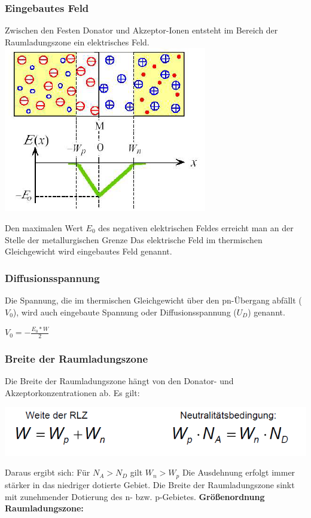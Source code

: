 	\subsubsection{Eingebautes Feld}
	
		\begin{center}
			Zwischen den Festen Donator und Akzeptor-Ionen entsteht im Bereich der Raumladungszone ein elektrisches Feld.
			\includegraphics[width=0.4\linewidth]{Kapitel/Kap08/eingebautesFeld.png}
		\end{center}
		Den maximalen Wert $E_0$ des negativen elektrischen Feldes erreicht man an der Stelle der metallurgischen Grenze
		\newline
		Das elektrische Feld im thermischen Gleichgewicht wird eingebautes Feld genannt.
		
	\subsubsection{Diffusionsspannung}
		Die Spannung, die im thermischen Gleichgewicht über den pn-Übergang abfällt ($V_0$), wird auch 		eingebaute Spannung oder Diffusionsspannung ($U_D$) genannt.
		
		$V_0 = - \frac{E_0*W}{2}$
		
	\subsubsection{Breite der Raumladungszone}
		Die Breite der Raumladungszone hängt von den Donator- und Akzeptorkonzentrationen ab. Es gilt:			
		\begin{center}
			\includegraphics[width=0.5\linewidth]{Kapitel/Kap08/breiteRaumladungszoneNeutralisaetsbedingung.png}	
		\end{center}
	
		Daraus ergibt sich:	Für $N_A > N_D$ gilt $W_n > W_p$
		\newline
		Die Ausdehnung erfolgt immer stärker in das niedriger
		dotierte Gebiet.
		\newline
		Die Breite der Raumladungszone sinkt mit zunehmender Dotierung des n- bzw. p-Gebietes.
		\newline
		\textbf{Größenordnung Raumladungszone:}
		
